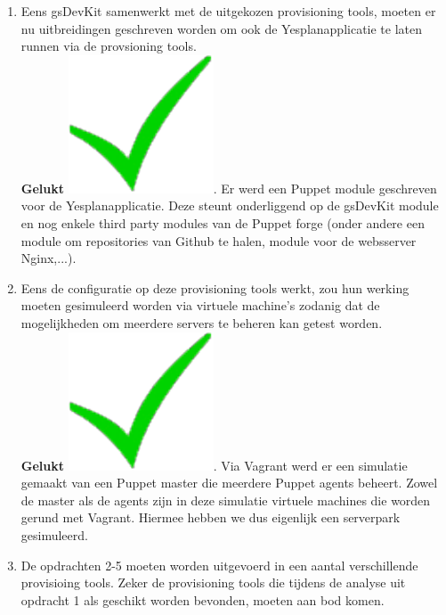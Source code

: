 \documentclass[a4paper,11pt]{article}
\theoremstyle{definition}
\begin{document}
\begin{enumerate}
\item Eens gsDevKit samenwerkt met de uitgekozen provisioning tools, moeten er nu uitbreidingen geschreven worden om ook 
de Yesplanapplicatie te laten runnen via de provsioning tools.\\

\noindent \textbf{Gelukt} \includegraphics[scale=0.15]{gelukt.pdf}. Er werd een 
Puppet module geschreven voor de Yesplanapplicatie. Deze steunt onderliggend op de 
gsDevKit module en nog enkele third party modules van de Puppet forge (onder andere een module om repositories van Github te halen, module
voor de websserver Nginx,...).

\item  Eens de configuratie op deze provisioning tools werkt, zou hun werking moeten gesimuleerd worden via virtuele machine’s 
zodanig dat de mogelijkheden om meerdere servers te beheren kan getest worden.\\

\noindent \textbf{Gelukt} \includegraphics[scale=0.15]{gelukt.pdf}. Via Vagrant 
werd er een simulatie gemaakt van een Puppet master die meerdere Puppet agents 
beheert. Zowel de master als de agents zijn in deze simulatie virtuele machines die worden gerund 
met Vagrant. Hiermee hebben we dus eigenlijk een serverpark gesimuleerd.

    \item De opdrachten 2-5 moeten worden uitgevoerd in een aantal verschillende provisioing 
    tools. Zeker de provisioning tools die tijdens de analyse uit opdracht 1 als geschikt worden 
    bevonden, moeten aan bod komen.\\
    

\end{enumerate}
\end{document}
